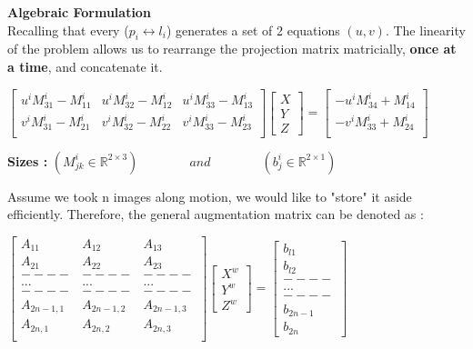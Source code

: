\documentclass[12pt]{article}
\begin{document}
\newpage


\textbf{{\Large Algebraic Formulation}} \\

Recalling that every ($p_i \leftrightarrow l_i$) generates a set of 2 equations $(u,v)$. The linearity of the problem allows us to rearrange the projection matrix matricially, \textbf{once at a time}, and concatenate it.

\begin{center}
$\begin{bmatrix}
u^iM^i_{31}-M^i_{11}	& u^iM^i_{32}-M^i_{12}	& u^iM^i_{33}-M^i_{13}	\\
v^iM^i_{31}-M^i_{21}	& v^iM^i_{32}-M^i_{22}	& v^iM^i_{33}-M^i_{23}	\\ 
\end{bmatrix} \begin{bmatrix} X \\ Y \\ Z \end{bmatrix} 
=\begin{bmatrix}
-u^iM^i_{34}+M^i_{14}		\\
-v^iM^i_{33}+M^i_{24}		\\ 
\end{bmatrix}$ 
\end{center}

\begin{center} \textbf{Sizes :}
$(M^i_{jk} \in \mathbb{R}^{2 \times 3}) \quad \quad \quad \quad and \quad \quad \quad \quad (b^i_{j} \in \mathbb{R}^{2 \times 1})$
\end{center}

Assume we took n images along motion, we would like to "store" it aside efficiently. Therefore, the general augmentation matrix can be denoted as : \\
\begin{center} $\begin{bmatrix}
A_{11}		& A_{12}		& A_{13}	\\
A_{21}		& A_{22}		& A_{23}	\\
----		&----			&----		\\
...			&...			&...		\\
----		&----			&----		\\
A_{2n-1,1}		& A_{2n-1,2}		& A_{2n-1,3}	\\
A_{2n,1}		& A_{2n,2}		& A_{2n,3}	\\
\end{bmatrix} \begin{bmatrix} X^w \\ Y^w \\ Z^w \end{bmatrix} = \begin{bmatrix} 
b_{l1} \\ b_{l2} \\ ---- \\ ... \\ ---- \\ b_{2n-1} \\ b_{2n} \end{bmatrix}$ \end{center}
\end{document}
